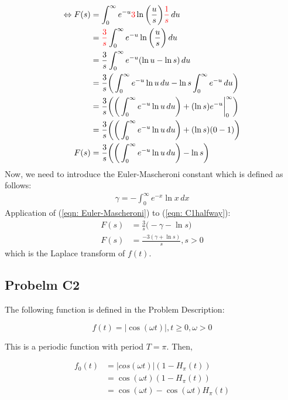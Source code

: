 \documentclass[a4paper,10pt,reqno]{amsart}
\numberwithin{equation}{section}
\begin{document}
\begin{align}
\Leftrightarrow F(s) &= \int_{0}^{\infty} e^{-u} \textcolor{red}{3}\ln \bigg(\frac{u}{s}\bigg) \textcolor{red}{\frac{1}{s}} \,du  \nonumber \\
&= \textcolor{red}{\frac{3}{s}} \int_{0}^{\infty} e^{-u} \ln \bigg(\frac{u}{s}\bigg) \,du  \nonumber \\
&= \frac{3}{s} \int_{0}^{\infty} e^{-u} (\ln u - \ln s) \,du  \nonumber \\
&= \frac{3}{s} \bigg( \int_{0}^{\infty} e^{-u} \ln u \,du - \ln s  \int_{0}^{\infty} e^{-u} \,du \bigg) \nonumber \\
&= \frac{3}{s} \bigg(\bigg( \int_{0}^{\infty} e^{-u} \ln u \,du \bigg) + (\ln s) e^{-u} \bigg|_0^\infty \bigg) \nonumber \\
&= \frac{3}{s} \bigg(\bigg( \int_{0}^{\infty} e^{-u} \ln u \,du \bigg) + (\ln s) (0-1) \bigg) \nonumber \\
F(s)&= \frac{3}{s} \bigg(\bigg( \int_{0}^{\infty} e^{-u} \ln u \,du \bigg) - \ln s \bigg) \label{eqn: C1halfway}
\end{align}
Now, we need to introduce the Euler-Mascheroni constant which is defined as follows:
\begin{align}
\gamma = -\int_{0}^{\infty} e^{-x} \ln x \,dx \label{eqn: Euler-Mascheroni}
\end{align}
Application of (\ref{eqn: Euler-Mascheroni}) to (\ref{eqn: C1halfway}):
\begin{align}
F(s) &= \frac{3}{s} \bigg( -\gamma - \ln s \bigg) \nonumber \\
F(s) &= \frac{-3(\gamma + \ln s)}{s}, s>0 \label{eqn: C1final}
\end{align}
which is the Laplace transform of $f(t)$.


\subsection{Probelm C2}\label{sec:c2}

The following function is defined in the Problem Description:

\begin{equation}
    f(t) = |\cos(\omega t)|, t \geq 0, \omega > 0
\end{equation}

This is a periodic function with period $T = \pi$. Then,

\begin{align}
f_0(t) &= |cos(\omega t)|(1 - H_\pi(t)) \\
&= \cos(\omega t)(1 - H_\pi(t)) \\
&= \cos(\omega t) - \cos(\omega t)H_\pi(t)
\end{align}
\end{document}
